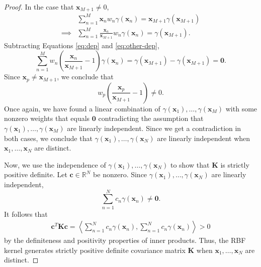 \begin{proof}
    In the case that $\mathbf{x}_{M + 1} \neq 0$,
    \begin{align}
        & \sum\limits_{n=1}^{M} \mathbf{x}_n w_n \gamma(\mathbf{x}_n) = {\mathbf{x}_{M + 1}}\gamma(\mathbf{x}_{M + 1}) \\
        \implies & \sum\limits_{n=1}^{M} \frac{\mathbf{x}_n}{\mathbf{x}_{M + 1}} w_n \gamma(\mathbf{x}_n) = \gamma(\mathbf{x}_{M + 1}). \label{eq:other-dep}
    \end{align}
    Subtracting Equations \ref{eq:dep} and \ref{eq:other-dep},
    \begin{equation*}
        \sum\limits_{n=1}^{M} w_n \left(\frac{\mathbf{x}_n}{\mathbf{x}_{M + 1}} - 1\right) \gamma(\mathbf{x}_n) = \gamma(\mathbf{x}_{M + 1}) - \gamma(\mathbf{x}_{M + 1}) = \mathbf{0}.
    \end{equation*}
    Since $\mathbf{x}_p \neq \mathbf{x}_{M + 1}$, we conclude that
    \begin{equation*}
        w_p\left(\frac{ \mathbf{x}_p }{ \mathbf{x}_{M + 1} } - 1\right) \neq 0.
    \end{equation*}
    Once again, we have found a linear combination of $\gamma(\mathbf{x}_1), \dots, \gamma(\mathbf{x}_M)$ with some nonzero weights that equals $\mathbf{0}$ contradicting the assumption that $\gamma(\mathbf{x}_1), \dots, \gamma(\mathbf{x}_M)$ are linearly independent.
    Since we get a contradiction in both cases, we conclude that $\gamma(\mathbf{x}_1), \dots, \gamma(\mathbf{x}_N)$ are linearly independent when $\mathbf{x}_1, \ldots, \mathbf{x}_N$ are distinct.

    Now, we use the independence of $\gamma(\mathbf{x}_1), \dots, \gamma(\mathbf{x}_N)$ to show that $\mathbf{K}$ is strictly positive definite.
    Let $\mathbf{c} \in \mathbb{R}^{N}$ be nonzero.
    Since $\gamma(\mathbf{x}_1), \dots, \gamma(\mathbf{x}_N)$ are linearly independent,
    \begin{equation*}
        \sum\limits_{n = 1}^{N} c_n \gamma(\mathbf{x}_n) \neq \mathbf{0}.
    \end{equation*}
    It follows that
    \begin{align*}
        \mathbf{c}^{T} \mathbf{K} \mathbf{c}
        = \left\langle \sum\limits_{n = 1}^{N} c_n \gamma(\mathbf{x}_n), \sum\limits_{n = 1}^{N} c_n \gamma(\mathbf{x}_n) \right\rangle
        > 0
    \end{align*}
    by the definiteness and positivity properties of inner products.
    Thus, the RBF kernel generates strictly positive definite covariance matrix $\mathbf{K}$ when $\mathbf{x}_1, \dots, \mathbf{x}_N$ are distinct.
\end{proof}
